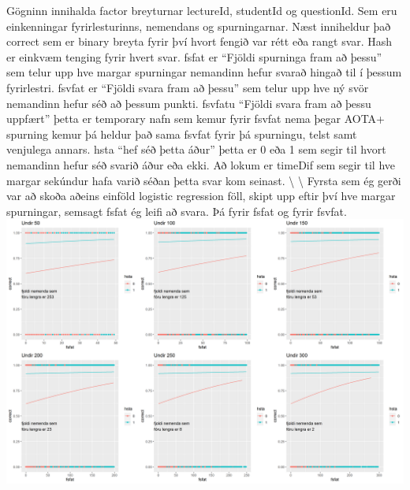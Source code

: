 \documentclass[
]{article}
\begin{document}
Gögninn innihalda factor breyturnar lectureId, studentId og questionId. Sem eru einkenningar fyrirlesturinns, nemendans og spurningarnar. Næst inniheldur það correct sem er binary breyta fyrir því hvort fengið var rétt eða rangt svar. Hash er einkvæm tenging fyrir hvert svar. fsfat er ``Fjöldi spurninga fram að þessu'' sem telur upp hve margar spurningar nemandinn hefur svarað hingað til í þessum fyrirlestri. fsvfat er ``Fjöldi svara fram að þessu'' sem telur upp hve ný svör nemandinn hefur séð að þessum punkti. fsvfatu ``Fjöldi svara fram að þessu uppfært'' þetta er temporary nafn sem kemur fyrir fsvfat nema þegar AOTA+ spurning kemur þá heldur það sama fsvfat fyrir þá spurningu, telst samt venjulega annars. hsta ``hef séð þetta áður'' þetta er 0 eða 1 sem segir til hvort nemandinn hefur séð svarið áður eða ekki. Að lokum er timeDif sem segir til hve margar sekúndur hafa varið séðan þetta svar kom seinast. \textbackslash{}
\textbackslash{}
Fyrsta sem ég gerði var að skoða aðeins einföld logistic regression föll, skipt upp eftir því hve margar spurningar, semsagt fsfat ég leifi að svara. Þá fyrir fsfat og fyrir fsvfat.
\includegraphics{Img/plot1.png}
\end{document}
